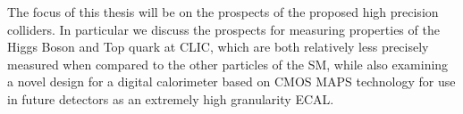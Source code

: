 The focus of this thesis will be on the prospects of the proposed high precision colliders. In particular we discuss the prospects for measuring properties of the Higgs Boson and Top quark at \ac{CLIC}, which are both relatively less precisely measured when compared to the other particles of the \ac{SM}, while also examining a novel design for a digital calorimeter based on \ac{CMOS} \ac{MAPS} technology for use in future detectors as an extremely high granularity \ac{ECAL}.  


 
